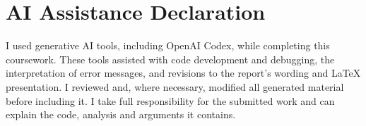 \section{AI Assistance Declaration}

I used generative AI tools, including OpenAI Codex, while completing this
coursework. These tools assisted with code development and debugging, the
interpretation of error messages, and revisions to the report's wording and
LaTeX presentation. I reviewed and, where necessary, modified all generated
material before including it. I take full responsibility for the submitted
work and can explain the code, analysis and arguments it contains.
